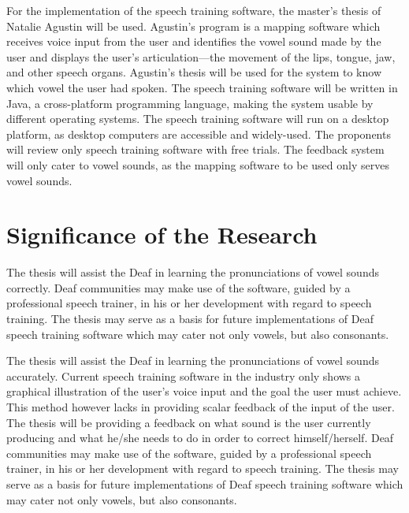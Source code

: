 For the implementation of the speech training software, the master's thesis of Natalie Agustin \citeyear{agustin:2014:SOM} will be used. Agustin's program is a mapping software which receives voice input from the user and identifies the vowel sound made by the user and displays the user’s articulation---the movement of the lips, tongue, jaw, and other speech organs. Agustin's thesis will be used for the system to know which vowel the user had spoken.
The speech training software will be written in Java, a cross-platform programming language, making the system usable by different operating systems.
The speech training software will run on a desktop platform, as desktop computers are accessible and widely-used.
The proponents will review only speech training software with free trials.
The feedback system will only cater to vowel sounds, as the mapping software to be used only serves vowel sounds.

\section{Significance of the Research}
\label{sec:significance}

The thesis will assist the Deaf in learning the pronunciations of vowel sounds correctly. Deaf communities may make use of the software, guided by a professional speech trainer, in his or her development with regard to speech training.
The thesis may serve as a basis for future implementations of Deaf speech training software which may cater not only vowels, but also consonants.

The thesis will assist the Deaf in learning the pronunciations of vowel sounds accurately. Current speech training software in the industry only shows a graphical illustration of the user's voice input and the goal the user must achieve. This method however lacks in providing scalar feedback of the input of the user. The thesis will be providing a feedback on what sound is the user currently producing and what he/she needs to do in order to correct himself/herself. Deaf communities may make use of the software, guided by a professional speech trainer, in his or her development with regard to speech training. The thesis may serve as a basis for future implementations of Deaf speech training software which may cater not only vowels, but also consonants.
